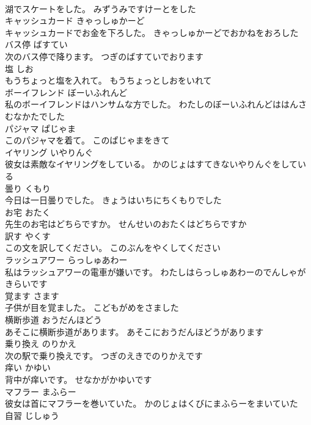 \documentclass[8pt]{extreport}
\begin{document}
\begin{CJK}{UTF8}{min}
\\	湖でスケートをした。	みずうみですけーとをした	
\\	キャッシュカード	きゃっしゅかーど	
\\	キャッシュカードでお金を下ろした。	きゃっしゅかーどでおかねをおろした	
\\	バス停	ばすてい	
\\	次のバス停で降ります。	つぎのばすていでおります	
\\	塩	しお	
\\	もうちょっと塩を入れて。	もうちょっとしおをいれて	
\\	ボーイフレンド	ぼーいふれんど	
\\	私のボーイフレンドはハンサムな方でした。	わたしのぼーいふれんどははんさむなかたでした	
\\	パジャマ	ぱじゃま	
\\	このパジャマを着て。	このぱじゃまをきて	
\\	イヤリング	いやりんぐ	
\\	彼女は素敵なイヤリングをしている。	かのじょはすてきないやりんぐをしている	
\\	曇り	くもり	
\\	今日は一日曇りでした。	きょうはいちにちくもりでした	
\\	お宅	おたく	
\\	先生のお宅はどちらですか。	せんせいのおたくはどちらですか	
\\	訳す	やくす	
\\	この文を訳してください。	このぶんをやくしてください	
\\	ラッシュアワー	らっしゅあわー	
\\	私はラッシュアワーの電車が嫌いです。	わたしはらっしゅあわーのでんしゃがきらいです	
\\	覚ます	さます	
\\	子供が目を覚ました。	こどもがめをさました	
\\	横断歩道	おうだんほどう	
\\	あそこに横断歩道があります。	あそこにおうだんほどうがあります	
\\	乗り換え	のりかえ	
\\	次の駅で乗り換えです。	つぎのえきでのりかえです	
\\	痒い	かゆい	
\\	背中が痒いです。	せなかがかゆいです	
\\	マフラー	まふらー	
\\	彼女は首にマフラーを巻いていた。	かのじょはくびにまふらーをまいていた	
\\	自習	じしゅう	

\end{CJK}
\end{document}
